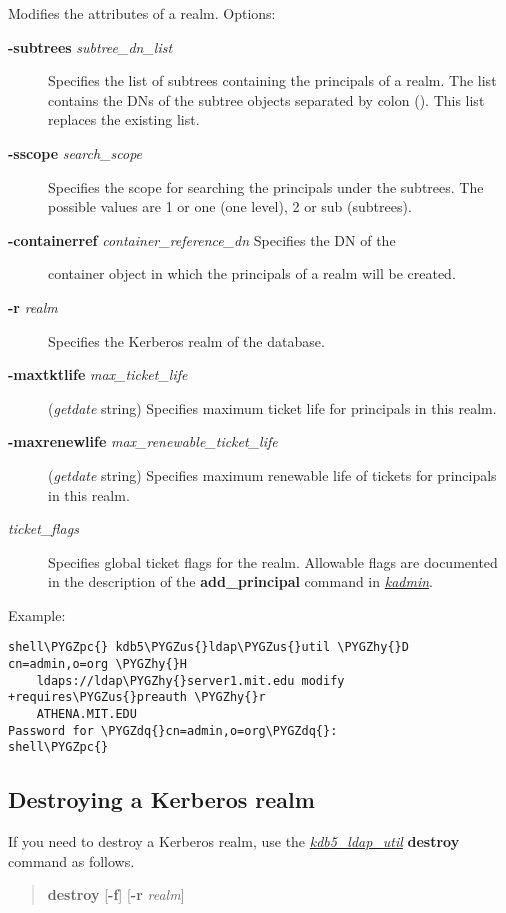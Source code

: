 \documentclass[letterpaper,10pt,english]{sphinxmanual}
\def\PYGZus{\char`\_}
\def\PYGZpc{\char`\%}
\def\PYGZhy{\char`\-}
\def\PYGZdq{\char`\"}
\begin{document}
Modifies the attributes of a realm.  Options:
\begin{description}
\item[{\textbf{-subtrees} \emph{subtree\_dn\_list}}] \leavevmode
Specifies the list of subtrees containing the principals of a
realm.  The list contains the DNs of the subtree objects separated
by colon (\code{:}).  This list replaces the existing list.

\item[{\textbf{-sscope} \emph{search\_scope}}] \leavevmode
Specifies the scope for searching the principals under the
subtrees.  The possible values are 1 or one (one level), 2 or sub
(subtrees).

\item[{\textbf{-containerref} \emph{container\_reference\_dn} Specifies the DN of the}] \leavevmode
container object in which the principals of a realm will be
created.

\item[{\textbf{-r} \emph{realm}}] \leavevmode
Specifies the Kerberos realm of the database.

\item[{\textbf{-maxtktlife} \emph{max\_ticket\_life}}] \leavevmode
(\emph{getdate} string) Specifies maximum ticket life for
principals in this realm.

\item[{\textbf{-maxrenewlife} \emph{max\_renewable\_ticket\_life}}] \leavevmode
(\emph{getdate} string) Specifies maximum renewable life of
tickets for principals in this realm.

\item[{\emph{ticket\_flags}}] \leavevmode
Specifies global ticket flags for the realm.  Allowable flags are
documented in the description of the \textbf{add\_principal} command in
{\hyperref[admin/admin_commands/kadmin_local:kadmin-1]{\emph{kadmin}}}.

\end{description}

Example:

\begin{Verbatim}[commandchars=\\\{\}]
shell\PYGZpc{} kdb5\PYGZus{}ldap\PYGZus{}util \PYGZhy{}D cn=admin,o=org \PYGZhy{}H
    ldaps://ldap\PYGZhy{}server1.mit.edu modify +requires\PYGZus{}preauth \PYGZhy{}r
    ATHENA.MIT.EDU
Password for \PYGZdq{}cn=admin,o=org\PYGZdq{}:
shell\PYGZpc{}
\end{Verbatim}


\subsection{Destroying a Kerberos realm}
\label{admin/database:destroying-a-kerberos-realm}
If you need to destroy a Kerberos realm, use the
{\hyperref[admin/admin_commands/kdb5_ldap_util:kdb5-ldap-util-8]{\emph{kdb5\_ldap\_util}}} \textbf{destroy} command as follows.
\begin{quote}

\textbf{destroy} {[}\textbf{-f}{]} {[}\textbf{-r} \emph{realm}{]}
\end{quote}
\end{document}
